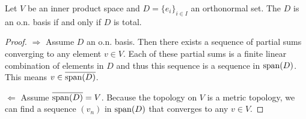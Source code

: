 \begin{proposition}
Let $V$ be an inner product space and $D = \{e_i\}_{i\in I}$ an orthonormal set. The $D$ is an o.n. basis \textup{if and only if} $D$ is total.
\end{proposition}
\begin{proof}
$\boxed{\Rightarrow}$ Assume $D$ an o.n. basis. Then there exists a sequence of partial sums converging to any element $v\in V$. Each of these partial sums is a finite linear combination of elements in $D$ and thus this sequence is a sequence in $\operatorname{span}(D)$. This means $v\in\overline{\operatorname{span}(D)}$.

$\boxed{\Leftarrow}$ Assume $\overline{\operatorname{span}(D)} = V$. Because the topology on $V$ is a metric topology, we can find a sequence $(v_n)$ in $\operatorname{span}(D)$ that converges to any $v\in V$.
\end{proof}


